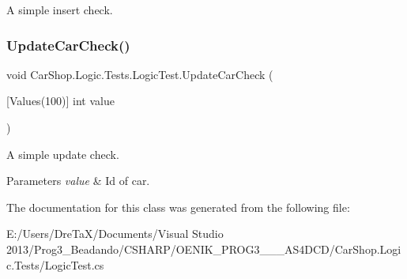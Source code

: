 A simple insert check. 

\mbox{\label{class_car_shop_1_1_logic_1_1_tests_1_1_logic_test_a76aef8798947707c11b898f268f1a121}} 
\subsubsection{\texorpdfstring{Update\+Car\+Check()}{UpdateCarCheck()}}
{\footnotesize\ttfamily void Car\+Shop.\+Logic.\+Tests.\+Logic\+Test.\+Update\+Car\+Check (\begin{DoxyParamCaption}\item[{\mbox{[}\+Values(100)\mbox{]} int}]{value }\end{DoxyParamCaption})}



A simple update check. 


\begin{DoxyParams}{Parameters}
{\em value} & Id of car.\\
\hline
\end{DoxyParams}


The documentation for this class was generated from the following file\+:\begin{DoxyCompactItemize}
\item 
E\+:/\+Users/\+Dre\+Ta\+X/\+Documents/\+Visual Studio 2013/\+Prog3\+\_\+\+Beadando/\+C\+S\+H\+A\+R\+P/\+O\+E\+N\+I\+K\+\_\+\+P\+R\+O\+G3\+\_\+\_\+\_\+\+A\+S4\+D\+C\+D/\+Car\+Shop.\+Logic.\+Tests/Logic\+Test.\+cs\end{DoxyCompactItemize}
